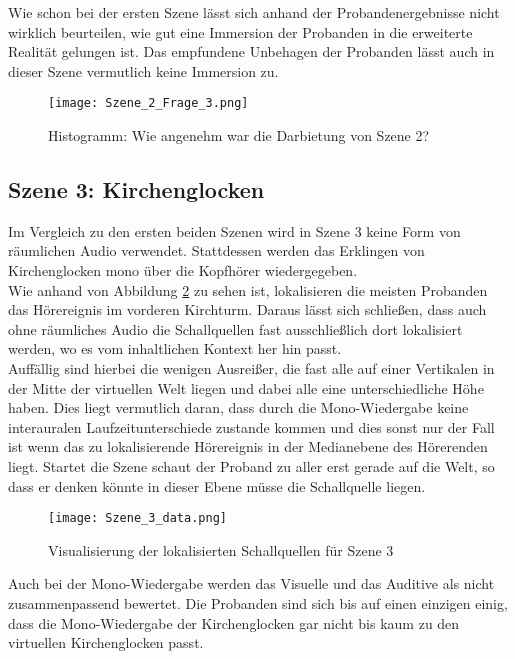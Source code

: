 Wie schon bei der ersten Szene lässt sich anhand der Probandenergebnisse nicht wirklich beurteilen, wie gut eine Immersion der Probanden in die erweiterte Realität gelungen ist. Das empfundene Unbehagen der Probanden lässt auch in dieser Szene vermutlich keine Immersion zu. 

   \begin{figure}[H]
\centering
\texttt{[image: Szene\_2\_Frage\_3.png]}
\caption{Histogramm: Wie angenehm war die Darbietung von Szene 2?}
\label{fig:Szene_2_Frage3}
\end{figure} 

 \subsection{Szene 3: Kirchenglocken}
Im Vergleich zu den ersten beiden Szenen wird in Szene 3 keine Form von räumlichen Audio verwendet. Stattdessen werden das Erklingen von Kirchenglocken mono über die Kopfhörer wiedergegeben.\\

Wie anhand von Abbildung \ref{fig:Szene_3_data} zu sehen ist, lokalisieren die meisten Probanden das Hörereignis im vorderen Kirchturm. Daraus lässt sich schließen, dass auch ohne räumliches Audio die Schallquellen fast ausschließlich dort lokalisiert werden, wo es vom inhaltlichen Kontext her hin passt.\\

Auffällig sind hierbei die wenigen Ausreißer, die fast alle auf einer Vertikalen in der Mitte der virtuellen Welt liegen und dabei alle eine unterschiedliche Höhe haben. Dies liegt vermutlich daran, dass durch die Mono-Wiedergabe keine interauralen Laufzeitunterschiede zustande kommen und dies sonst nur der Fall ist wenn das zu lokalisierende Hörereignis in der Medianebene des Hörerenden liegt. Startet die Szene schaut der Proband zu aller erst gerade auf die Welt, so dass er denken könnte in dieser Ebene müsse die Schallquelle liegen.

 
   \begin{figure}[H]
\centering
\texttt{[image: Szene\_3\_data.png]}
\caption{Visualisierung der lokalisierten Schallquellen für Szene 3}
\label{fig:Szene_3_data}
\end{figure} 

Auch bei der Mono-Wiedergabe werden das Visuelle und  das Auditive als nicht zusammenpassend bewertet. Die Probanden sind sich bis auf einen einzigen einig, dass die Mono-Wiedergabe der Kirchenglocken gar nicht bis kaum zu den virtuellen Kirchenglocken passt.

